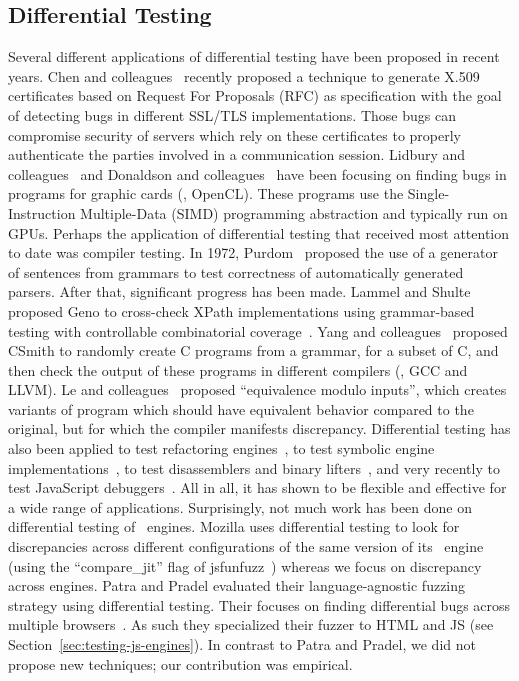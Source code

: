 \documentclass[sigconf,review, anonymous]{acmart}
\begin{document}
\subsection{Differential Testing}
Several different applications of differential testing have been
proposed in recent years. Chen and
colleagues~\cite{Chen:2018:RDT:3180155.3180226} recently proposed a
technique to generate X.509 certificates based on Request For
Proposals (RFC) as specification with the goal of detecting bugs in
different SSL/TLS implementations. Those bugs can compromise security
of servers which rely on these certificates to properly authenticate
the parties involved in a communication session. Lidbury and
colleagues~\cite{Lidbury:2015:MCF:2737924.2737986} and Donaldson and
colleagues~\cite{Donaldson:2017:ATG:3152284.3133917} have been
focusing on finding bugs in programs for graphic cards (\eg{},
OpenCL). These programs use the Single-Instruction Multiple-Data
(SIMD) programming abstraction and typically run on GPUs.  Perhaps the
application of differential testing that received most attention to
date was compiler testing. In 1972, Purdom~\cite{Purdom1972} proposed
the use of a generator of sentences from grammars to test correctness
of automatically generated parsers. After that, significant progress
has been made. Lammel and Shulte proposed Geno to cross-check XPath
implementations using grammar-based testing with controllable
combinatorial coverage~\cite{10.1007/11754008_2}. Yang and
colleagues~\cite{Yang:2011:FUB:1993498.1993532} proposed CSmith to
randomly create C programs from a grammar, for a subset of C, and then
check the output of these programs in different compilers (\eg{}, GCC
and LLVM). Le and colleagues~\cite{Le:2014:CVV:2594291.2594334}
proposed ``equivalence modulo inputs'', which creates variants of
program which should have equivalent behavior compared to the
original, but for which the compiler manifests
discrepancy. Differential testing has also been applied to test
refactoring engines~\cite{Daniel:2007:ATR:1287624.1287651}, to test
symbolic engine implementations~\cite{Kapus:2017:ATS:3155562.3155636},
to test disassemblers and binary
lifters~\cite{Paleari:2010:NDD:1831708.1831741,Kim:2017:TIR:3155562.3155609},
and very recently to test JavaScript
debuggers~\cite{DBLP:conf/sigsoft/LehmannP18}. All in all, it has
shown to be flexible and effective for a wide range of
applications. Surprisingly, not much work has been done on
differential testing of \js\ engines. Mozilla uses differential
testing to look for discrepancies across different configurations of
the same version of its \smonkey\ engine (using the ``compare\_jit''
flag of jsfunfuzz~\cite{jsfunfuzz}) whereas we focus on discrepancy
across engines. Patra and Pradel evaluated their language-agnostic
fuzzing strategy using differential testing. Their focuses on finding
differential bugs across multiple
browsers~\cite{patra2016learning}. As such they specialized their
fuzzer to HTML and JS (see Section~\ref{sec:testing-js-engines}). In
contrast to Patra and Pradel, we did not propose new techniques; our
contribution was empirical.
\end{document}
